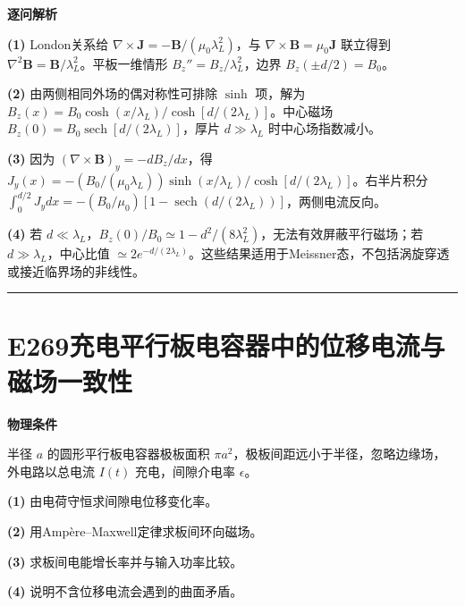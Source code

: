 \documentclass[UTF8,a4paper,11pt,oneside,openany]{ctexbook}
\begin{document}
\par\medskip\noindent\textbf{逐问解析}
\par\noindent\textbf{(1)} London关系给 \(\nabla\times\boldsymbol J=-\boldsymbol B/(\mu_0\lambda_L^2)\)，与 \(\nabla\times\boldsymbol B=\mu_0\boldsymbol J\) 联立得到 \(\nabla^2\boldsymbol B=\boldsymbol B/\lambda_L^2\)。平板一维情形 \(B_z''=B_z/\lambda_L^2\)，边界 \(B_z(\pm d/2)=B_0\)。
\par\noindent\textbf{(2)} 由两侧相同外场的偶对称性可排除 \(\sinh\) 项，解为 \(B_z(x)=B_0\cosh(x/\lambda_L)/\cosh[d/(2\lambda_L)]\)。中心磁场 \(B_z(0)=B_0\operatorname{sech}[d/(2\lambda_L)]\)，厚片 \(d\gg\lambda_L\) 时中心场指数减小。
\par\noindent\textbf{(3)} 因为 \((\nabla\times\boldsymbol B)_y=-dB_z/dx\)，得 \(J_y(x)=-(B_0/(\mu_0\lambda_L))\sinh(x/\lambda_L)/\cosh[d/(2\lambda_L)]\)。右半片积分 \(\int_0^{d/2}J_y dx=-(B_0/\mu_0)[1-\operatorname{sech}(d/(2\lambda_L))]\)，两侧电流反向。
\par\noindent\textbf{(4)} 若 \(d\ll\lambda_L\)，\(B_z(0)/B_0\simeq1-d^2/(8\lambda_L^2)\)，无法有效屏蔽平行磁场；若 \(d\gg\lambda_L\)，中心比值 \(\simeq2e^{-d/(2\lambda_L)}\)。这些结果适用于Meissner态，不包括涡旋穿透或接近临界场的非线性。

\par\bigskip\hrule\bigskip
\section*{E269\quad 充电平行板电容器中的位移电流与磁场一致性}
\textbf{物理条件}\par 半径 \(a\) 的圆形平行板电容器极板面积 \(\pi a^2\)，极板间距远小于半径，忽略边缘场，外电路以总电流 \(I(t)\) 充电，间隙介电率 \(\epsilon\)。
\par\noindent\textbf{(1)} 由电荷守恒求间隙电位移变化率。
\par\noindent\textbf{(2)} 用Ampère–Maxwell定律求板间环向磁场。
\par\noindent\textbf{(3)} 求板间电能增长率并与输入功率比较。
\par\noindent\textbf{(4)} 说明不含位移电流会遇到的曲面矛盾。
\end{document}
